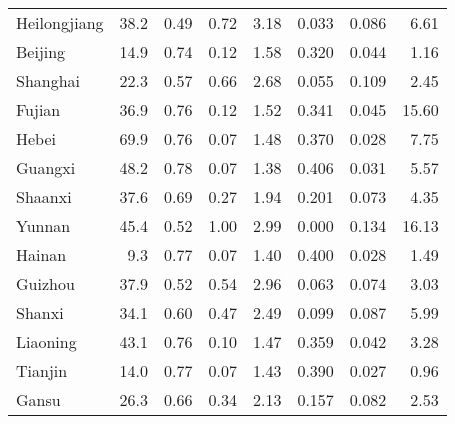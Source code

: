 \begin{tabular}{lrrrrrrr}
 Heilongjiang   &       38.2 &  0.49 &  0.72 &                   3.18 &                          0.033 &                              0.086 &        6.61 \\
 Beijing        &       14.9 &  0.74 &  0.12 &                   1.58 &                          0.320 &                              0.044 &        1.16 \\
 Shanghai       &       22.3 &  0.57 &  0.66 &                   2.68 &                          0.055 &                              0.109 &        2.45 \\
 Fujian         &       36.9 &  0.76 &  0.12 &                   1.52 &                          0.341 &                              0.045 &       15.60 \\
 Hebei          &       69.9 &  0.76 &  0.07 &                   1.48 &                          0.370 &                              0.028 &        7.75 \\
 Guangxi        &       48.2 &  0.78 &  0.07 &                   1.38 &                          0.406 &                              0.031 &        5.57 \\
 Shaanxi        &       37.6 &  0.69 &  0.27 &                   1.94 &                          0.201 &                              0.073 &        4.35 \\
 Yunnan         &       45.4 &  0.52 &  1.00 &                   2.99 &                          0.000 &                              0.134 &       16.13 \\
 Hainan         &        9.3 &  0.77 &  0.07 &                   1.40 &                          0.400 &                              0.028 &        1.49 \\
 Guizhou        &       37.9 &  0.52 &  0.54 &                   2.96 &                          0.063 &                              0.074 &        3.03 \\
 Shanxi         &       34.1 &  0.60 &  0.47 &                   2.49 &                          0.099 &                              0.087 &        5.99 \\
 Liaoning       &       43.1 &  0.76 &  0.10 &                   1.47 &                          0.359 &                              0.042 &        3.28 \\
 Tianjin        &       14.0 &  0.77 &  0.07 &                   1.43 &                          0.390 &                              0.027 &        0.96 \\
 Gansu          &       26.3 &  0.66 &  0.34 &                   2.13 &                          0.157 &                              0.082 &        2.53 \\

\end{tabular}

